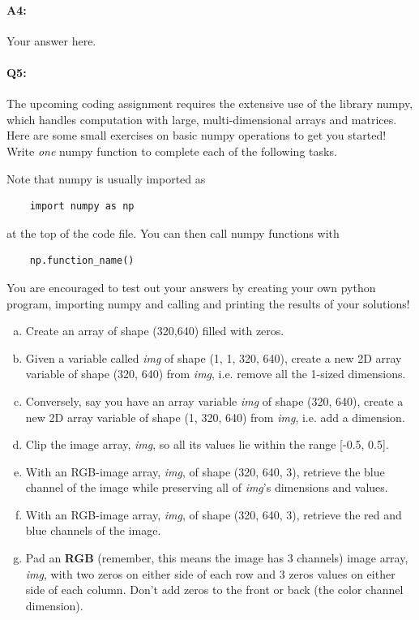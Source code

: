 \paragraph{A4:} Your answer here.





\pagebreak 
\paragraph{Q5:} The upcoming coding assignment requires the extensive use of the library numpy, which handles computation with large, multi-dimensional arrays and matrices. Here are some small exercises on basic numpy operations to get you started! Write \emph{one} numpy function to complete each of the following tasks.

Note that numpy is usually imported as
\begin{verbatim}
    import numpy as np
\end{verbatim}
at the top of the code file. You can then call numpy functions with \begin{verbatim}
    np.function_name()
\end{verbatim}
You are encouraged to test out your answers by creating your own python program, importing numpy and calling and printing the results of your solutions!

\begin{enumerate}[a.]
    \item Create an array of shape (320,640) filled with zeros.
    \item Given a variable called \emph{img} of shape (1, 1, 320, 640), create a new 2D array variable of shape (320, 640) from \emph{img}, i.e. remove all the 1-sized dimensions. 
    \item Conversely, say you have an array variable \emph{img} of shape (320, 640), create a new 2D array variable of shape (1, 320, 640) from \emph{img}, i.e. add a dimension. 
    \item Clip the image array, \emph{img}, so all its values lie within the range [-0.5, 0.5].
    \item With an RGB-image array, \emph{img}, of shape (320, 640, 3), retrieve the blue channel of the image while preserving all of \emph{img}'s dimensions and values. 
    \item With an RGB-image array, \emph{img}, of shape (320, 640, 3), retrieve the red and blue channels of the image. 
    \item Pad an \textbf{RGB} (remember, this means the image has 3 channels) image array, \emph{img}, with two zeros on either side of each row and 3 zeros values on either side of each column. Don't add zeros to the front or back (the color channel dimension).
\end{enumerate}


